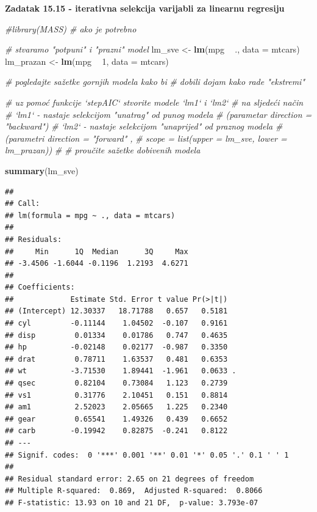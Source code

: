 \documentclass[]{book}
\newenvironment{Shaded}{\begin{snugshade}}{\end{snugshade}}
\newcommand{\KeywordTok}[1]{\textcolor[rgb]{0.13,0.29,0.53}{\textbf{#1}}}
\newcommand{\DataTypeTok}[1]{\textcolor[rgb]{0.13,0.29,0.53}{#1}}
\newcommand{\DecValTok}[1]{\textcolor[rgb]{0.00,0.00,0.81}{#1}}
\newcommand{\StringTok}[1]{\textcolor[rgb]{0.31,0.60,0.02}{#1}}
\newcommand{\CommentTok}[1]{\textcolor[rgb]{0.56,0.35,0.01}{\textit{#1}}}
\newcommand{\OperatorTok}[1]{\textcolor[rgb]{0.81,0.36,0.00}{\textbf{#1}}}
\newcommand{\NormalTok}[1]{#1}
\theoremstyle{definition}
\theoremstyle{definition}
\theoremstyle{definition}
\theoremstyle{remark}
\begin{document}
\textbf{Zadatak 15.15 - iterativna selekcija varijabli za linearnu
regresiju}

\begin{Shaded}
\begin{Highlighting}[]
\CommentTok{#library(MASS) # ako je potrebno}

\CommentTok{# stvaramo "potpuni" i "prazni" model }
\NormalTok{lm_sve <-}\StringTok{ }\KeywordTok{lm}\NormalTok{(mpg }\OperatorTok{~}\StringTok{ }\NormalTok{., }\DataTypeTok{data =}\NormalTok{ mtcars)   }
\NormalTok{lm_prazan <-}\StringTok{ }\KeywordTok{lm}\NormalTok{(mpg }\OperatorTok{~}\StringTok{ }\DecValTok{1}\NormalTok{, }\DataTypeTok{data =}\NormalTok{ mtcars)}

\CommentTok{# pogledajte sažetke gornjih modela kako bi }
\CommentTok{# dobili dojam kako rade "ekstremi"}

\CommentTok{# uz pomoć funkcije `stepAIC` stvorite modele `lm1` i `lm2` }
\CommentTok{# na sljedeći način}
\CommentTok{# `lm1` - nastaje selekcijom "unatrag" od punog modela}
\CommentTok{#         (parametar direction = "backward")}
\CommentTok{# `lm2` - nastaje selekcijom "unaprijed" od praznog modela}
\CommentTok{#         (parametri direction = "forward" , }
\CommentTok{#         scope = list(upper = lm_sve, lower = lm_prazan))}
\CommentTok{#}
\CommentTok{# proučite sažetke dobivenih modela}
\end{Highlighting}
\end{Shaded}

\begin{Shaded}
\begin{Highlighting}[]
\KeywordTok{summary}\NormalTok{(lm_sve)}
\end{Highlighting}
\end{Shaded}

\begin{verbatim}
## 
## Call:
## lm(formula = mpg ~ ., data = mtcars)
## 
## Residuals:
##     Min      1Q  Median      3Q     Max 
## -3.4506 -1.6044 -0.1196  1.2193  4.6271 
## 
## Coefficients:
##             Estimate Std. Error t value Pr(>|t|)  
## (Intercept) 12.30337   18.71788   0.657   0.5181  
## cyl         -0.11144    1.04502  -0.107   0.9161  
## disp         0.01334    0.01786   0.747   0.4635  
## hp          -0.02148    0.02177  -0.987   0.3350  
## drat         0.78711    1.63537   0.481   0.6353  
## wt          -3.71530    1.89441  -1.961   0.0633 .
## qsec         0.82104    0.73084   1.123   0.2739  
## vs1          0.31776    2.10451   0.151   0.8814  
## am1          2.52023    2.05665   1.225   0.2340  
## gear         0.65541    1.49326   0.439   0.6652  
## carb        -0.19942    0.82875  -0.241   0.8122  
## ---
## Signif. codes:  0 '***' 0.001 '**' 0.01 '*' 0.05 '.' 0.1 ' ' 1
## 
## Residual standard error: 2.65 on 21 degrees of freedom
## Multiple R-squared:  0.869,  Adjusted R-squared:  0.8066 
## F-statistic: 13.93 on 10 and 21 DF,  p-value: 3.793e-07
\end{verbatim}
\end{document}
